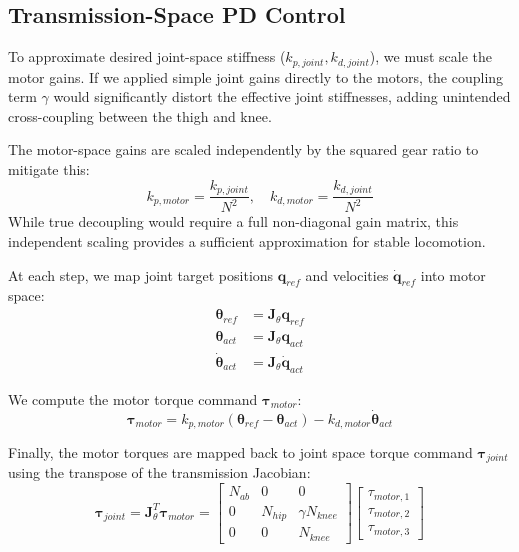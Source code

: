 \documentclass[11pt,a4paper]{article}
\begin{document}
\subsection{Transmission-Space PD Control}
To approximate desired joint-space stiffness ($k_{p, joint}, k_{d, joint}$), we must scale the motor gains. If we applied simple joint gains directly to the motors, the coupling term $\gamma$ would significantly distort the effective joint stiffnesses, adding unintended cross-coupling between the thigh and knee.

The motor-space gains are scaled independently by the squared gear ratio to mitigate this:
\begin{equation}
k_{p, motor} = \frac{k_{p, joint}}{N^2}, \quad k_{d, motor} = \frac{k_{d, joint}}{N^2}
\end{equation}
While true decoupling would require a full non-diagonal gain matrix, this independent scaling provides a sufficient approximation for stable locomotion.

At each step, we map joint target positions $\mathbf{q}_{ref}$ and velocities $\mathbf{\dot{q}}_{ref}$ into motor space:
\begin{align}
\mathbf{\theta}_{ref} &= \mathbf{J}_{\theta} \mathbf{q}_{ref} \\
\mathbf{\theta}_{act} &= \mathbf{J}_{\theta} \mathbf{q}_{act} \\
\mathbf{\dot{\theta}}_{act} &= \mathbf{J}_{\theta} \mathbf{\dot{q}}_{act}
\end{align}

We compute the motor torque command $\mathbf{\tau}_{motor}$:
\begin{equation}
\mathbf{\tau}_{motor} = k_{p, motor} (\mathbf{\theta}_{ref} - \mathbf{\theta}_{act}) - k_{d, motor} \mathbf{\dot{\theta}}_{act}
\end{equation}

Finally, the motor torques are mapped back to joint space torque command $\mathbf{\tau}_{joint}$ using the transpose of the transmission Jacobian:
\begin{equation}
\mathbf{\tau}_{joint} = \mathbf{J}_{\theta}^T \mathbf{\tau}_{motor} = \begin{bmatrix} N_{ab} & 0 & 0 \\ 0 & N_{hip} & \gamma N_{knee} \\ 0 & 0 & N_{knee} \end{bmatrix} \begin{bmatrix} \tau_{motor, 1} \\ \tau_{motor, 2} \\ \tau_{motor, 3} \end{bmatrix}
\end{equation}
\end{document}
